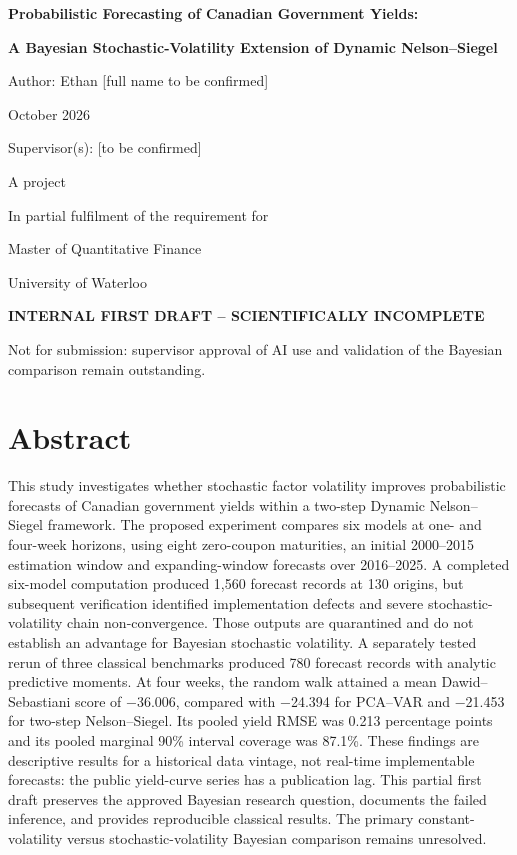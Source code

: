 \documentclass[
  12pt,
  letterpaper,
  DIV=11,
  numbers=noendperiod]{scrreprt}
\author{}
\date{}
\begin{document}
\begin{titlepage}
\centering
\vspace*{1cm}
{\Large\bfseries Probabilistic Forecasting of Canadian Government Yields:\par}
\vspace{0.4cm}
{\Large\bfseries A Bayesian Stochastic-Volatility Extension of Dynamic Nelson--Siegel\par}
\vspace{1.6cm}
{\large Author: Ethan [full name to be confirmed]\par}
\vspace{0.7cm}
October 2026\par
\vspace{0.7cm}
Supervisor(s): [to be confirmed]\par
\vfill
A project\par
In partial fulfilment of the requirement for\par
Master of Quantitative Finance\par
University of Waterloo\par
\vspace{1cm}
\textbf{INTERNAL FIRST DRAFT -- SCIENTIFICALLY INCOMPLETE}\par
Not for submission: supervisor approval of AI use and validation of the Bayesian comparison remain outstanding.
\end{titlepage}
\chapter*{Abstract}

This study investigates whether stochastic factor volatility improves
probabilistic forecasts of Canadian government yields within a two-step
Dynamic Nelson--Siegel framework. The proposed experiment compares six
models at one- and four-week horizons, using eight zero-coupon
maturities, an initial 2000--2015 estimation window and expanding-window
forecasts over 2016--2025. A completed six-model computation produced
1,560 forecast records at 130 origins, but subsequent verification
identified implementation defects and severe stochastic-volatility chain
non-convergence. Those outputs are quarantined and do not establish an
advantage for Bayesian stochastic volatility. A separately tested rerun
of three classical benchmarks produced 780 forecast records with
analytic predictive moments. At four weeks, the random walk attained a
mean Dawid--Sebastiani score of −36.006, compared with −24.394 for
PCA--VAR and −21.453 for two-step Nelson--Siegel. Its pooled yield RMSE
was 0.213 percentage points and its pooled marginal 90\% interval
coverage was 87.1\%. These findings are descriptive results for a
historical data vintage, not real-time implementable forecasts: the
public yield-curve series has a publication lag. This partial first
draft preserves the approved Bayesian research question, documents the
failed inference, and provides reproducible classical results. The
primary constant-volatility versus stochastic-volatility Bayesian
comparison remains unresolved.
\end{document}
